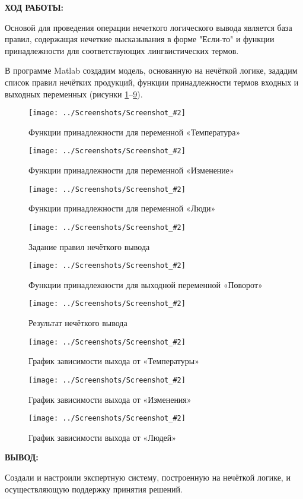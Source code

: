 \documentclass[14pt,a4paper]{extreport}
\newcommand{\sshot}[2]{\begin{figure}[ht]%
\centering\texttt{[image: ../Screenshots/Screenshot\_\#2]}%
\caption{#1}%
\label{sshot#2}%
\end{figure}%
}
\newcommand{\header}[1]{%
{
\clearpage%
\fontsize{16pt}{14pt}\selectfont
\begin{center}
\textbf{\MakeUppercase{#1}:}
\end{center}
}
}
\begin{document}
\header{Ход работы}



Основой для проведения операции нечеткого логического вывода является база правил, содержащая нечеткие высказывания в форме "Если-то" и функции принадлежности для соответствующих лингвистических термов.

\par
В программе Matlab создадим модель, основанную на нечёткой логике, зададим список правил нечётких продукций, функции принадлежности термов входных и выходных переменных (рисунки \ref{sshot1}--\ref{sshot9}).

\sshot{Функции принадлежности для переменной «Температура»}{1}
\sshot{Функции принадлежности для переменной «Изменение»}{2}
\sshot{Функции принадлежности для переменной «Люди»}{3}
\sshot{Задание правил нечёткого вывода}{4}
\sshot{Функции принадлежности для выходной переменной «Поворот»}{5}
\sshot{Результат нечёткого вывода}{6}
\sshot{График зависимости выхода от «Температуры»}{7}
\sshot{График зависимости выхода от «Изменения»}{8}
\sshot{График зависимости выхода от «Людей»}{9}

\header{Вывод}



Создали и настроили экспертную систему, построенную на нечёткой логике, и осуществляющую поддержку принятия решений.
\end{document}
